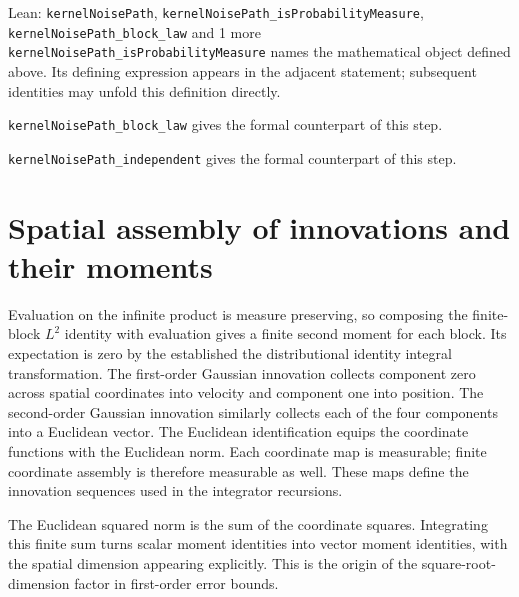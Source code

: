 \documentclass[11pt,a4paper]{article}
\begin{document}
\begin{leanbox}{Lean: \texttt{kernelNoisePath}, \texttt{kernelNoisePath\_\allowbreak{}isProbabilityMeasure}, \texttt{kernelNoisePath\_\allowbreak{}block\_\allowbreak{}law} and 1 more}
\texttt{kernel\allowbreak{}Noise\allowbreak{}Path\_\allowbreak{}is\allowbreak{}Probability\allowbreak{}Measure} names the mathematical object defined above. Its defining expression appears in the adjacent statement; subsequent identities may unfold this definition directly.




\texttt{kernel\allowbreak{}Noise\allowbreak{}Path\_\allowbreak{}block\_\allowbreak{}law} gives the formal counterpart of this step.




\texttt{kernel\allowbreak{}Noise\allowbreak{}Path\_\allowbreak{}independent} gives the formal counterpart of this step.
\end{leanbox}

\section{\texorpdfstring{Spatial assembly of innovations and their moments}{Spatial assembly of innovations and their moments}}


Evaluation on the infinite product is measure preserving, so composing the finite-block \(L^{2}\) identity with evaluation gives a finite second moment for each block. Its expectation is zero by the established the distributional identity integral transformation. The first-order Gaussian innovation collects component zero across spatial coordinates into velocity and component one into position. The second-order Gaussian innovation similarly collects each of the four components into a Euclidean vector. The Euclidean identification equips the coordinate functions with the Euclidean norm. Each coordinate map is measurable; finite coordinate assembly is therefore measurable as well. These maps define the innovation sequences used in the integrator recursions.



The Euclidean squared norm is the sum of the coordinate squares. Integrating this finite sum turns scalar moment identities into vector moment identities, with the spatial dimension appearing explicitly. This is the origin of the square-root-dimension factor in first-order error bounds.
\end{document}
